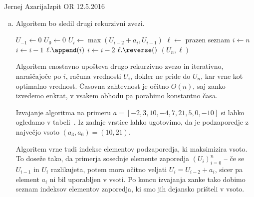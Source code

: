 \begin{naloga}{Jernej Azarija}{Izpit OR 12.5.2016}
\begin{odgovor}
\begin{enumerate}[(a)]
Vrstni red iskanja vrednosti $U_i$ določimo z naraščajočim zaporedjem indeksov $i$, ko $1\leq i \leq n$, 
saj imamo tako pred reševanjem problema $U_i$
definirane vse predhodne vrednosti.
Ko izračunamo vse vrednosti $U_i$,
je maksimum vsote zaporedja enak $U^* = U_n$,
kar sledi neposredno iz definicije vrednosti $U_n$.

\item Algoritem bo sledil drugi rekurzivni zvezi.

\begin{small}
\begin{algorithmic}
	\State $U_{-1} \gets 0$
	\State $U_0 \gets 0$
		\State $U_i \gets \max(U_{i-2} + a_i, U_{i-1})$
	\EndFor
    \State $\ell \gets$ prazen seznam
    \State $i \gets n$
            \State $i \gets i-1$
        \Else
            \State $\ell.\append(i)$
            \State $i \gets i-2$
        \EndIf
    \EndWhile
    \State $\ell.\reverse()$
	\State \Return $(U_n, \ell)$
\EndFunction
\end{algorithmic}
\end{small}

Algoritem enostavno upošteva drugo rekurzivno zvezo in iterativno,
naraščajoče po $i$,
računa vrednosti $U_i$, dokler ne pride do $U_n$,
kar vrne kot optimalno vrednost.
Časovna zahtevnost je očitno $O(n)$, saj zanko izvedemo enkrat,
v vsakem obhodu pa porabimo konstantno časa.

Izvajanje algoritma na primeru $a = [-2, 3, 10, -4, 7, 21, 5, 0, -10]$
si lahko ogledamo v tabeli~\tab.
Iz zadnje vrstice lahko ugotovimo,
da je podzaporedje z največjo vsoto $(a_3, a_6) = (10, 21)$.

Algoritem vrne tudi indekse elementov podzaporedja, ki maksimizira vsoto.
To doseže tako, da primerja sosednje elemente zaporedja $(U_i)_{i=0}^n$
-- če se $U_{i-1}$ in $U_i$ razlikujeta,
potem mora očitno veljati $U_i = U_{i-2} + a_i$,
sicer pa element $a_i$ ni bil uporabljen v vsoti.
Po koncu izvajanja zanke tako dobimo seznam indeksov elementov zaporedja,
ki smo jih dejansko prišteli v vsoto.
\end{enumerate}


\end{odgovor}
\end{naloga}

